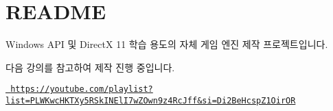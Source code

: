 \chapter{README}
\hypertarget{md__r_e_a_d_m_e}{}\label{md__r_e_a_d_m_e}
Windows API 및 DirectX 11 학습 용도의 자체 게임 엔진 제작 프로젝트입니다.

다음 강의를 참고하여 제작 진행 중입니다.

\href{https://youtube.com/playlist?list=PLWKwcHKTXy5RSkINElI7wZOwn9z4RcJff&si=Di2BeHcspZ1OirOR}{\texttt{ https\+://youtube.\+com/playlist?list=\+PLWKwc\+HKTXy5\+RSk\+INEl\+I7w\+ZOwn9z4\+Rc\+Jff\&si=\+Di2\+Be\+Hcsp\+Z1\+Oir\+OR}} 